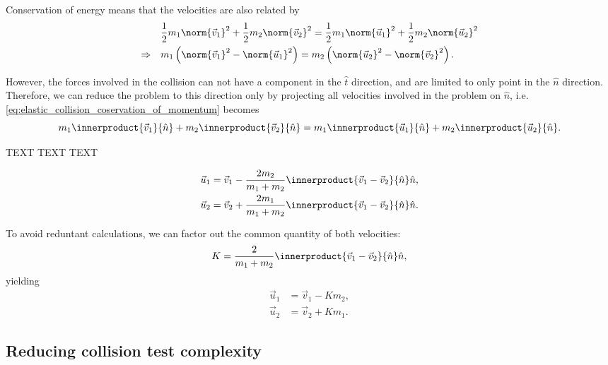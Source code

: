 Conservation of energy means that the velocities are also related by
\begin{equation}
	\begin{aligned}
		                 & \frac{1}{2}m_{1}\norm{\vec{v}_{1}}^{2} + \frac{1}{2}m_{2}\norm{\vec{v}_{2}}^{2} = \frac{1}{2}m_{1}\norm{\vec{u}_{1}}^{2} + \frac{1}{2}m_{2}\norm{\vec{u}_{2}}^{2} \\
		\Rightarrow\quad & m_{1}\left(\norm{\vec{v}_{1}}^{2} - \norm{\vec{u}_{1}}^{2}\right) = m_{2}\left(\norm{\vec{u}_{2}}^{2} - \norm{\vec{v}_{2}}^{2}\right).
	\end{aligned}
	\label{eq:elastic_collision_coservation_of_energy}
\end{equation}

However, the forces involved in the collision can not have a component in the $\hat{t}$ direction, and are limited to only point in the $\hat{n}$ direction. Therefore, we can reduce the problem to this direction only by projecting all velocities involved in the problem on $\hat{n}$, i.e. \autoref{eq:elastic_collision_coservation_of_momentum} becomes
\begin{equation}
	m_{1}\innerproduct{\vec{v}_{1}}{\hat{n}} + m_{2}\innerproduct{\vec{v}_{2}}{\hat{n}} = m_{1}\innerproduct{\vec{u}_{1}}{\hat{n}} + m_{2}\innerproduct{\vec{u}_{2}}{\hat{n}}.
	\label{eq:elastic_collision_coservation_of_momentum_projection}
\end{equation}

TEXT TEXT TEXT

\begin{equation}
	\begin{aligned}
		\vec{u}_{1} & = \vec{v}_{1} - \frac{2m_{2}}{m_{1}+m_{2}}\innerproduct{\vec{v}_{1}-\vec{v}_{2}}{\hat{n}}\hat{n}, \\
		\vec{u}_{2} & = \vec{v}_{2} + \frac{2m_{1}}{m_{1}+m_{2}}\innerproduct{\vec{v}_{1}-\vec{v}_{2}}{\hat{n}}\hat{n}.
	\end{aligned}
\end{equation}

To avoid reduntant calculations, we can factor out the common quantity of both velocities:
\begin{equation}
	K = \frac{2}{m_{1}+m_{2}}\innerproduct{\vec{v}_{1}-\vec{v}_{2}}{\hat{n}}\hat{n},
	\label{eq:elastic_collision_common_quantity}
\end{equation}
yielding
\begin{equation}
	\begin{aligned}
		\vec{u}_{1} & = \vec{v}_{1}-Km_{2}, \\
		\vec{u}_{2} & = \vec{v}_{2}+Km_{1}.
	\end{aligned}
	\label{eq:elastic_collision_final_equation}
\end{equation}

\subsection{Reducing collision test complexity}
